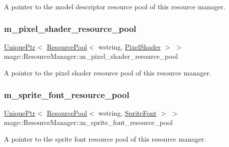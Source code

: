 A pointer to the model descriptor resource pool of this resource manager. \hypertarget{classmage_1_1_resource_manager_a139203cf050a3a8146f89b4b643d6092}{}\label{classmage_1_1_resource_manager_a139203cf050a3a8146f89b4b643d6092} 
\subsubsection{\texorpdfstring{m\+\_\+pixel\+\_\+shader\+\_\+resource\+\_\+pool}{m\_pixel\_shader\_resource\_pool}}
{\footnotesize\ttfamily \hyperlink{namespacemage_a8c307fbcc33bce9b7f2aa4c26c3b95cf}{Unique\+Ptr}$<$ \hyperlink{classmage_1_1_resource_pool}{Resource\+Pool}$<$ wstring, \hyperlink{classmage_1_1_pixel_shader}{Pixel\+Shader} $>$ $>$ mage\+::\+Resource\+Manager\+::m\+\_\+pixel\+\_\+shader\+\_\+resource\+\_\+pool\hspace{0.3cm}{\ttfamily [private]}}

A pointer to the pixel shader resource pool of this resource manager. \hypertarget{classmage_1_1_resource_manager_a49369b160a75dee96cdebd2b957ae0c4}{}\label{classmage_1_1_resource_manager_a49369b160a75dee96cdebd2b957ae0c4} 
\subsubsection{\texorpdfstring{m\+\_\+sprite\+\_\+font\+\_\+resource\+\_\+pool}{m\_sprite\_font\_resource\_pool}}
{\footnotesize\ttfamily \hyperlink{namespacemage_a8c307fbcc33bce9b7f2aa4c26c3b95cf}{Unique\+Ptr}$<$ \hyperlink{classmage_1_1_resource_pool}{Resource\+Pool}$<$ wstring, \hyperlink{classmage_1_1_sprite_font}{Sprite\+Font} $>$ $>$ mage\+::\+Resource\+Manager\+::m\+\_\+sprite\+\_\+font\+\_\+resource\+\_\+pool\hspace{0.3cm}{\ttfamily [private]}}

A pointer to the sprite font resource pool of this resource manager. \hypertarget{classmage_1_1_resource_manager_aba76c2267b30ccae61c160497e8d8efc}{}\label{classmage_1_1_resource_manager_aba76c2267b30ccae61c160497e8d8efc} 
